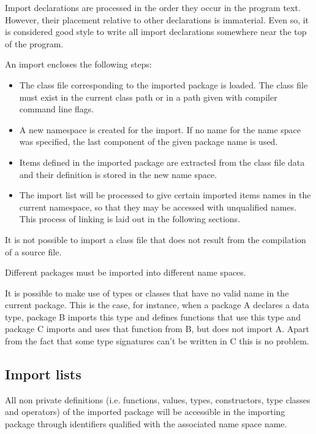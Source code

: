 
Import declarations are processed in the order they occur in the program text. 
However, their placement relative to other declarations is immaterial. 
Even so, it is considered good style to write all import declarations somewhere near the top of the program.

An import encloses the following steps:
\begin{itemize}
\item The class file corresponding to the imported package is loaded.
The class file must exist in the current class path or in a path given
with compiler command line flags.
\item A new namespace is created for the import. If no name for the name
space was specified, the last component of the given package name is
used.
\item Items defined in the imported package are extracted from the class file
data and their definition is stored in the new name space.
\item The import list will be processed to give certain imported items names in the current namespace, so that they may be accessed with unqualified names. This process of linking is laid out in the following sections.
\end{itemize}

It is not possible to import a \java{} class file that does not result
from the compilation of a \frege{} source file.

Different packages must be imported into different name spaces.

It is possible to make use of types or classes that have no valid name in the current package. 
This is the case, for instance, when a package A declares a data type, 
package B imports this type and defines functions that use this type 
and package C imports and uses that function from B, but does not import A. 
Apart from the fact that some type signatures can't be written in C this is no problem.

\subsection{Import lists}

All non private definitions (i.e. functions, values, types, constructors,
type classes and operators) of the imported package will be accessible in
the importing package through identifiers qualified with the associated
name space name.

